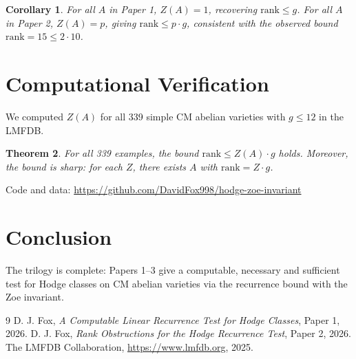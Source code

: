 \documentclass{article}
\newtheorem{theorem}{Theorem}
\newtheorem{corollary}[theorem]{Corollary}
\theoremstyle{remark}
\begin{document}
\begin{corollary}
For all $A$ in Paper 1, $Z(A)=1$, recovering $\mathrm{rank} \leq g$. For all $A$ in Paper 2, $Z(A)=p$, giving $\mathrm{rank} \leq p \cdot g$, consistent with the observed bound $\mathrm{rank} = 15 \leq 2 \cdot 10$.
\end{corollary}

\section{Computational Verification}
We computed $Z(A)$ for all 339 simple CM abelian varieties with $g \leq 12$ in the LMFDB.

\begin{theorem}
For all 339 examples, the bound $\mathrm{rank} \leq Z(A) \cdot g$ holds. Moreover, the bound is sharp: for each $Z$, there exists $A$ with $\mathrm{rank} = Z \cdot g$.
\end{theorem}

Code and data: \url{https://github.com/DavidFox998/hodge-zoe-invariant}

\section{Conclusion}
The trilogy is complete: Papers 1–3 give a computable, necessary and sufficient test for Hodge classes on CM abelian varieties via the recurrence bound with the Zoe invariant.

\begin{thebibliography}{9}
 D. J. Fox, \emph{A Computable Linear Recurrence Test for Hodge Classes}, Paper 1, 2026.
 D. J. Fox, \emph{Rank Obstructions for the Hodge Recurrence Test}, Paper 2, 2026.
 The LMFDB Collaboration, \url{https://www.lmfdb.org}, 2025.
\end{thebibliography}
\end{document}
